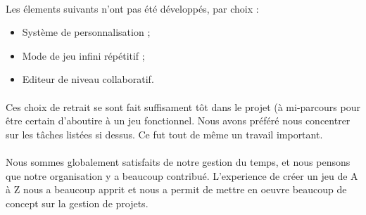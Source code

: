 \paragraph{}
Les élements suivants n'ont pas été développés, par choix :
\begin{itemize}
\item Système de personnalisation ;
\item Mode de jeu infini répétitif ;
\item Editeur de niveau collaboratif.
\end{itemize}

\paragraph{}
Ces choix de retrait se sont fait suffisament tôt dans le projet (à mi-parcours pour être certain d'aboutire à un jeu fonctionnel. Nous avons préféré nous concentrer sur les tâches listées si dessus. Ce fut tout de même un travail important.

\paragraph{}
Nous sommes globalement satisfaits de notre gestion du temps, et nous pensons que notre organisation y a beaucoup contribué.
L'experience de créer un jeu de A à Z nous a beaucoup apprit et nous a permit de mettre en oeuvre beaucoup de concept sur la gestion de projets.



